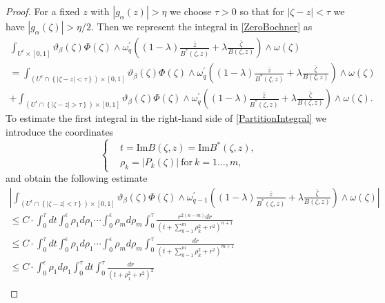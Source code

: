 \documentclass[11pt,reqno]{amsart}
\numberwithin{equation}{section}
\begin{document}
\begin{proof} For a fixed $z$ with $|g_{\alpha}(z)|>\eta$ we choose $\tau>0$ so that for
$|\zeta-z|<\tau$ we have $|g_{\alpha}(\zeta)|>\eta/2$. Then we represent the integral
in \eqref{ZeroBochner} as
\begin{multline}\label{PartitionIntegral}
\int_{U^{\epsilon}\times[0,1]}
\vartheta_{\beta}(\zeta)\Phi(\zeta)
\wedge\omega^{\prime}_{q}\left((1-\lambda)\frac{\bar z}{B^*(\zeta,z)}
+\lambda\frac{\bar\zeta}{B(\zeta,z)}\right)\wedge\omega(\zeta)\\
=\int_{\left(U^{\epsilon}\cap\left\{|\zeta-z|<\tau\right\}\right)\times[0,1]}
\vartheta_{\beta}(\zeta)\Phi(\zeta)
\wedge\omega^{\prime}_{q}\left((1-\lambda)\frac{\bar z}{B^*(\zeta,z)}
+\lambda\frac{\bar\zeta}{B(\zeta,z)}\right)\wedge\omega(\zeta)\\
+\int_{\left(U^{\epsilon}\cap\left\{|\zeta-z|>\tau\right\}\right)\times[0,1]}
\vartheta_{\beta}(\zeta)\Phi(\zeta)
\wedge\omega^{\prime}_{q}\left((1-\lambda)\frac{\bar z}{B^*(\zeta,z)}
+\lambda\frac{\bar\zeta}{B(\zeta,z)}\right)\wedge\omega(\zeta).
\end{multline}
\indent
To estimate the first integral in the right-hand side of \eqref{PartitionIntegral}
we introduce the coordinates
\begin{equation}\label{SmallCoordinates}
\left\{\begin{aligned}
&t=\text{Im}B(\zeta,z)=\text{Im}B^*(\zeta,z),\\
&\rho_k=\left|P_k(\zeta)\right|\ \text{for}\ k=1\dots, m,
\end{aligned}\right.
\end{equation}
and obtain the following estimate
\begin{multline}\label{FirstBochner}
\left|\int_{\left(U^{\epsilon}\cap\left\{|\zeta-z|<\tau\right\}\right)\times[0,1]}
\vartheta_{\beta}(\zeta)\Phi(\zeta)
\wedge\omega^{\prime}_{q-1}\left((1-\lambda)\frac{\bar z}{B^*(\zeta,z)}
+\lambda\frac{\bar\zeta}{B(\zeta,z)}\right)\wedge\omega(\zeta)\right|\\
\leq C\cdot\int_0^{\tau}dt\int_0^{\epsilon}\rho_1 d\rho_1\cdots
\int_0^{\epsilon}\rho_m d\rho_m
\int_0^{\tau}\frac{r^{2(n-m)}dr}{\left(t+\sum_{k=1}^m\rho_k^2+r^2\right)^{n+1}}\\
\leq C\cdot\int_0^{\tau}dt\int_0^{\epsilon}\rho_1 d\rho_1\cdots \int_0^{\epsilon}\rho_m d\rho_m
\int_0^{\tau}\frac{dr}{\left(t+\sum_{k=1}^m\rho_k^2+r^2\right)^{m+1}}\\
\leq C\cdot\int_0^{\epsilon}\rho_1 d\rho_1\int_0^{\tau}dt
\int_0^{\tau}\frac{dr}{\left(t+\rho_1^2+r^2\right)^{2}}\\

\end{multline}
\end{proof}
\end{document}
